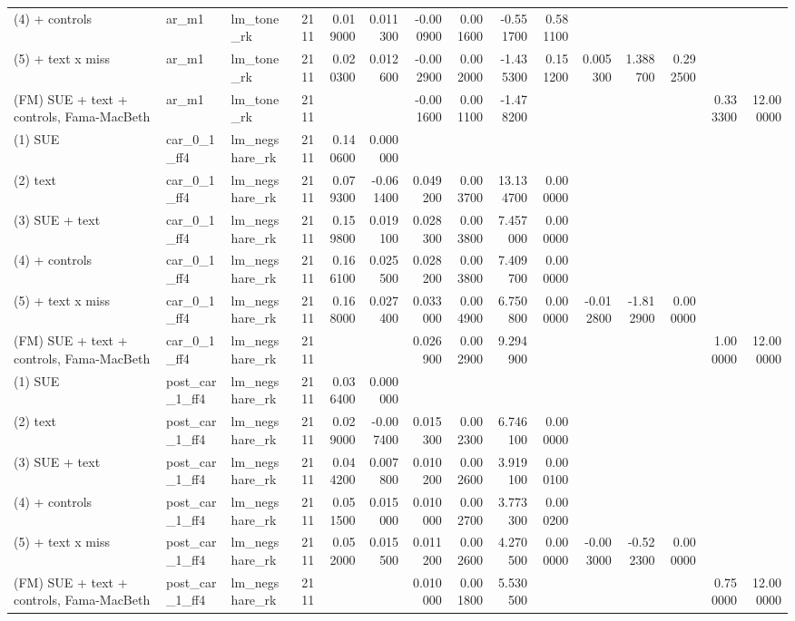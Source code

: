 \begin{table}
\begin{tabular}{lllrrrrrrrrrrrr}
(4) + controls & ar\_m1 & lm\_tone\_rk & 2111 & 0.019000 & 0.011300 & -0.000900 & 0.001600 & -0.551700 & 0.581100 &  &  &  &  &  \\
(5) + text x miss & ar\_m1 & lm\_tone\_rk & 2111 & 0.020300 & 0.012600 & -0.002900 & 0.002000 & -1.435300 & 0.151200 & 0.005300 & 1.388700 & 0.292500 &  &  \\
(FM) SUE + text + controls, Fama-MacBeth & ar\_m1 & lm\_tone\_rk & 2111 &  &  & -0.001600 & 0.001100 & -1.478200 &  &  &  &  & 0.333300 & 12.000000 \\
(1) SUE & car\_0\_1\_ff4 & lm\_negshare\_rk & 2111 & 0.140600 & 0.000000 &  &  &  &  &  &  &  &  &  \\
(2) text & car\_0\_1\_ff4 & lm\_negshare\_rk & 2111 & 0.079300 & -0.061400 & 0.049200 & 0.003700 & 13.134700 & 0.000000 &  &  &  &  &  \\
(3) SUE + text & car\_0\_1\_ff4 & lm\_negshare\_rk & 2111 & 0.159800 & 0.019100 & 0.028300 & 0.003800 & 7.457000 & 0.000000 &  &  &  &  &  \\
(4) + controls & car\_0\_1\_ff4 & lm\_negshare\_rk & 2111 & 0.166100 & 0.025500 & 0.028200 & 0.003800 & 7.409700 & 0.000000 &  &  &  &  &  \\
(5) + text x miss & car\_0\_1\_ff4 & lm\_negshare\_rk & 2111 & 0.168000 & 0.027400 & 0.033000 & 0.004900 & 6.750800 & 0.000000 & -0.012800 & -1.812900 & 0.000000 &  &  \\
(FM) SUE + text + controls, Fama-MacBeth & car\_0\_1\_ff4 & lm\_negshare\_rk & 2111 &  &  & 0.026900 & 0.002900 & 9.294900 &  &  &  &  & 1.000000 & 12.000000 \\
(1) SUE & post\_car\_1\_ff4 & lm\_negshare\_rk & 2111 & 0.036400 & 0.000000 &  &  &  &  &  &  &  &  &  \\
(2) text & post\_car\_1\_ff4 & lm\_negshare\_rk & 2111 & 0.029000 & -0.007400 & 0.015300 & 0.002300 & 6.746100 & 0.000000 &  &  &  &  &  \\
(3) SUE + text & post\_car\_1\_ff4 & lm\_negshare\_rk & 2111 & 0.044200 & 0.007800 & 0.010200 & 0.002600 & 3.919100 & 0.000100 &  &  &  &  &  \\
(4) + controls & post\_car\_1\_ff4 & lm\_negshare\_rk & 2111 & 0.051500 & 0.015000 & 0.010000 & 0.002700 & 3.773300 & 0.000200 &  &  &  &  &  \\
(5) + text x miss & post\_car\_1\_ff4 & lm\_negshare\_rk & 2111 & 0.052000 & 0.015500 & 0.011200 & 0.002600 & 4.270500 & 0.000000 & -0.003000 & -0.522300 & 0.000000 &  &  \\
(FM) SUE + text + controls, Fama-MacBeth & post\_car\_1\_ff4 & lm\_negshare\_rk & 2111 &  &  & 0.010000 & 0.001800 & 5.530500 &  &  &  &  & 0.750000 & 12.000000 \\

\end{tabular}
\end{table}

